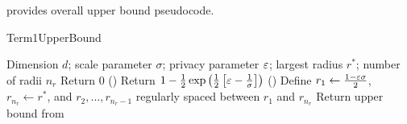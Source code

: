  provides overall upper bound pseudocode.

\begin{algorithm}
    \caption{Term1UpperBound}
    \label{alg:term_1_ub}
    \begin{algorithmic}[1]
     Dimension $d$; scale parameter $\sigma$; privacy parameter $\varepsilon$; largest radius $r^*$; number of radii $n_r$
            \STATE Return 0 ()
        \ENDIF
            \STATE Return $1 - \frac{1}{2}\exp\left(\frac{1}{2}\left[\varepsilon - \frac{1}{\sigma}\right]\right)$ ()
        \ENDIF
        \STATE Define $r_1 \gets \frac{1-\varepsilon \sigma}{2}$, $r_{n_r} \gets r^*$, and $r_2, \ldots, r_{n_r-1}$ regularly spaced between $r_1$ and $r_{n_r}$
        \STATE Return upper bound from 
    \end{algorithmic}
\end{algorithm}

